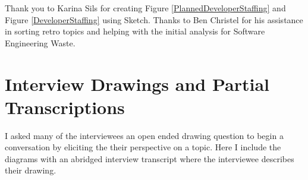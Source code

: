 \documentclass[oneside,letterpaper]{memoir}
\begin{document}
Thank you to Karina Sils for creating Figure \ref{PlannedDeveloperStaffing} and Figure \ref{DeveloperStaffing} using Sketch. Thanks to Ben Christel for his assistance in sorting retro topics and helping with the initial analysis for Software Engineering Waste.



\newpage
\tableofcontents
\listoftables
\listoffigures

\mainmatter



% 
% 
% 










\appendix


\chapter{Interview Drawings and Partial Transcriptions}
\label{AppendixInterviews}
I asked many of the interviewees an open ended drawing question to begin a conversation by eliciting the their perspective on a topic. Here I include the diagrams with an abridged interview transcript where the interviewee describes their drawing.









\backmatter
\end{document}

